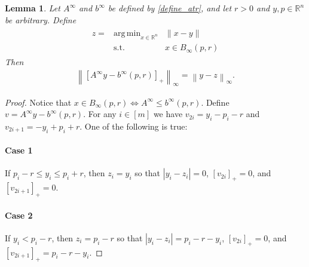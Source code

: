 \documentclass{article}
\newtheorem{lemma}[theorem]{Lemma}
\theoremstyle{case}
\numberwithin{theorem}{subsection}
\DeclareMathOperator*{\argmin}{arg\,min}
\newcommand{\atr}{A^{\infty}}
\newcommand{\btr}{b^{\infty}}
\newcommand{\bpr}{{B_{\infty}\left(p, r\right)}}
\newcommand{\Rn}{\mathbb R^n}
\begin{document}
\begin{lemma}
\label{huffman_of_infinity_ball}
Let $\atr$ and $\btr$ be defined by \cref{define_atr}, and let $r > 0$ and $y, p \in \Rn$ be arbitrary.
Define 
\begin{align*}
\begin{array}{ccc}
z =   & \argmin_{x \in \Rn} & \|x - y\| 					\\
      & \textrm{s.t.}       & x \in \bpr
\end{array}
\end{align*}
Then
\begin{align*}
\left\|\left[\atr y - \btr\left(p, r\right)\right]_+ \right\|_{\infty} = \left\|y - z\right\|_{\infty}.
\end{align*}

\end{lemma}
\begin{proof}

Notice that $ x \in B_{\infty}\left(p, r\right)	\Longleftrightarrow \atr \le \btr\left(p, r\right)$.
Define $v = \atr y - \btr\left(p, r\right)$.
For any $i \in [m]$ we have
$v_{2i} = y_i - p_i - r$ and $v_{2i + 1} = -y_i + p_i + r$.
One of the following is true:
\paragraph{Case 1}
If $p_i - r \le y_i \le p_i + r$, then $z_i = y_i    $ so that $\left|y_i - z_i\right| = 0            $, $\left[v_{2i}\right]_+ = 0$, and $\left[v_{2i+1}\right]_+ = 0$.
\paragraph{Case 2}
If $y_i < p_i - r              $, then $z_i = p_i - r$ so that $\left|y_i - z_i\right| = p_i - r - y_i$, $\left[v_{2i}\right]_+ = 0$, and $\left[v_{2i+1}\right]_+ = p_i - r - y_i$.

\end{proof}
\end{document}

